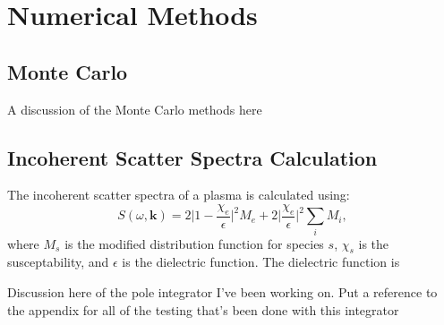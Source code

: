 \chapter{Numerical Methods}

\section{Monte Carlo}

A discussion of the Monte Carlo methods here



\section{Incoherent Scatter Spectra Calculation}
The incoherent scatter spectra of a plasma is calculated using: %
\begin{equation}
		S(\omega, \mathbf{k}) = 2 \bigg| 1 - \frac{\chi_e}{\epsilon} \bigg|^2 M_e
						+ 2 \bigg| \frac{\chi_e}{\epsilon} \bigg|^2 \sum_i M_i,
\end{equation}
where $M_s$ is the modified distribution function for species $s$,
$\chi_s$ is the susceptability, 
and $\epsilon$ is the dielectric function. 
The dielectric function is 


Discussion here of the pole integrator I've been working on. 
Put a reference to the appendix for all of the testing that's been done with this integrator